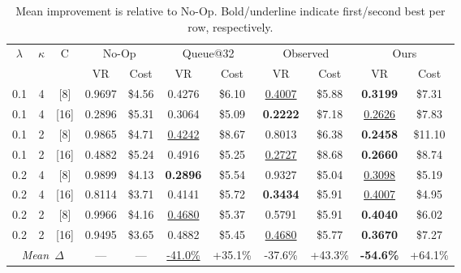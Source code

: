 \documentclass{article}
\begin{document}
\begin{table}[t]
\centering
\footnotesize
\setlength{\tabcolsep}{2.5pt}
\caption{Mean improvement is relative to No-Op. Bold/underline indicate first/second best per row, respectively.}\label{tab:todo}
\begin{tabular}{c c c || c c | c c | c c | c c}
\toprule
$\lambda$ & $\kappa$ & C & \multicolumn{2}{c|}{No-Op} & \multicolumn{2}{c|}{Queue@32} & \multicolumn{2}{c|}{Observed} & \multicolumn{2}{c}{Ours} \\
 &  &  & VR & Cost & VR & Cost & VR & Cost & VR & Cost \\
\hline
0.1 & 4 & [8] & 0.9697 & \$4.56 & 0.4276 & \$6.10 & \underline{0.4007} & \$5.88 & \textbf{0.3199} & \$7.31 \\
0.1 & 4 & [16] & 0.2896 & \$5.31 & 0.3064 & \$5.09 & \textbf{0.2222} & \$7.18 & \underline{0.2626} & \$7.83 \\
0.1 & 2 & [8] & 0.9865 & \$4.71 & \underline{0.4242} & \$8.67 & 0.8013 & \$6.38 & \textbf{0.2458} & \$11.10 \\
0.1 & 2 & [16] & 0.4882 & \$5.24 & 0.4916 & \$5.25 & \underline{0.2727} & \$8.68 & \textbf{0.2660} & \$8.74 \\
0.2 & 4 & [8] & 0.9899 & \$4.13 & \textbf{0.2896} & \$5.54 & 0.9327 & \$5.04 & \underline{0.3098} & \$5.19 \\
0.2 & 4 & [16] & 0.8114 & \$3.71 & 0.4141 & \$5.72 & \textbf{0.3434} & \$5.91 & \underline{0.4007} & \$4.95 \\
0.2 & 2 & [8] & 0.9966 & \$4.16 & \underline{0.4680} & \$5.37 & 0.5791 & \$5.91 & \textbf{0.4040} & \$6.02 \\
0.2 & 2 & [16] & 0.9495 & \$3.65 & 0.4882 & \$5.45 & \underline{0.4680} & \$5.77 & \textbf{0.3670} & \$7.27 \\
\hline
\multicolumn{3}{c||}{\textit{Mean~$\Delta$}} & --- & --- & \underline{-41.0\%} & +35.1\% & -37.6\% & +43.3\% & \textbf{-54.6\%} & +64.1\% \\
\bottomrule
\end{tabular}
\end{table}
\end{document}
